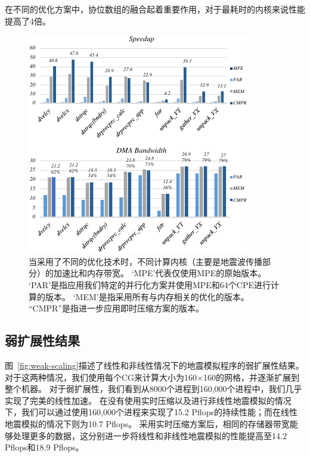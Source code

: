 \documentclass[degree=doctor]{thuthesis}
\begin{document}
在不同的优化方案中，协位数组的融合起着重要作用，对于最耗时的内核来说性能提高了4倍。

\begin{figure}[t]
\centering
\includegraphics[width=0.9\columnwidth]{awp_performance.pdf}
\caption{当采用了不同的优化技术时，不同计算内核（主要是地震波传播部分）的加速比和内存带宽。 `MPE'代表仅使用MPE的原始版本。 `PAR'是指应用我们特定的并行化方案并使用MPE和64个CPE进行计算的版本。 `MEM'是指采用所有与内存相关的优化的版本。 “CMPR”是指进一步应用即时压缩方案的版本。}
\label{fig:kernel-result}
\end{figure}

\subsection{弱扩展性结果}

图~\ref {fig:weak-scaling}描述了线性和非线性情况下的地震模拟程序的弱扩展性结果。 对于这两种情况，我们使用每个CG来计算大小为160×160的网格，并逐渐扩展到整个机器。 对于弱扩展性，我们看到从8000个进程到160,000个进程中，我们几乎实现了完美的线性加速。 在没有使用实时压缩以及进行非线性地震模拟的情况下，我们可以通过使用160,000个进程来实现了15.2 Pflops的持续性能；而在线性地震模拟的情况下则为10.7 Pflops。 采用实时压缩方案后，相同的存储器带宽能够处理更多的数据，这分别进一步将线性和非线性地震模拟的性能提高至14.2 Pflops和18.9 Pflops。
\end{document}
